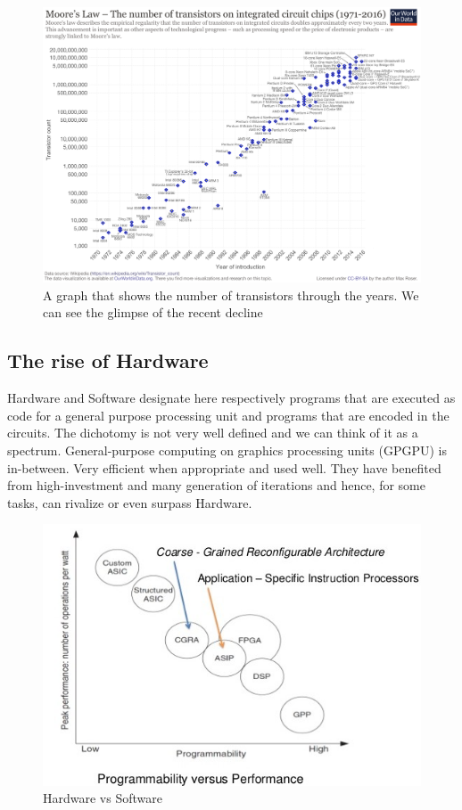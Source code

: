 \documentclass[]{article}
\begin{document}
\begin{figure}
\centering
\includegraphics{moorelaw.png}
\caption{A graph that shows the number of transistors through the years.
We can see the glimpse of the recent decline}
\end{figure}

\subsection{The rise of Hardware}\label{the-rise-of-hardware}

Hardware and Software designate here respectively programs that are
executed as code for a general purpose processing unit and programs that
are encoded in the circuits. The dichotomy is not very well defined and
we can think of it as a spectrum. General-purpose computing on graphics
processing units (GPGPU) is in-between. Very efficient when appropriate
and used well. They have benefited from high-investment and many
generation of iterations and hence, for some tasks, can rivalize or even
surpass Hardware.

\begin{figure}
\centering
\includegraphics{hwsf.jpg}
\caption{Hardware vs Software}
\end{figure}
\end{document}
